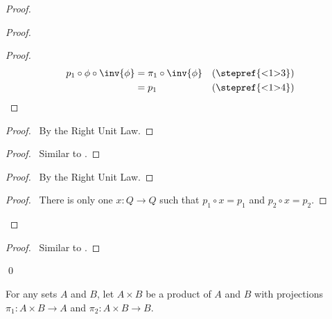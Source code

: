 \begin{proof}
  \pf
  \begin{proof}
    \begin{proof}
      \pf
      \begin{align*}
        p_1 \circ \phi \circ \inv{\phi} & = \pi_1 \circ \inv{\phi} & 
        (\text{\stepref{<1>3}})\\
        & = p_1 & (\text{\stepref{<1>4}})
      \end{align*}
    \end{proof}
    \begin{proof}
      \pf\ By the Right Unit Law.
    \end{proof}
    \begin{proof}
      \pf\ Similar to .
    \end{proof}
    \begin{proof}
      \pf\ By the Right Unit Law.
    \end{proof}
    \qedstep
    \begin{proof}
      \pf\ There is only one $x : Q \rightarrow Q$ such that $p_1 \circ x = p_1$ 
      and $p_2 \circ x = p_2$.
    \end{proof}
  \end{proof}
  \begin{proof}
    \pf\ Similar to .
  \end{proof}
  \qed
\end{proof}

\begin{df}
  For any sets $A$ and $B$, let $A \times B$ be a product of $A$ and $B$ with 
  projections $\pi_1 : A \times B \rightarrow A$ and $\pi_2 : A \times B 
  \rightarrow B$.
\end{df}

